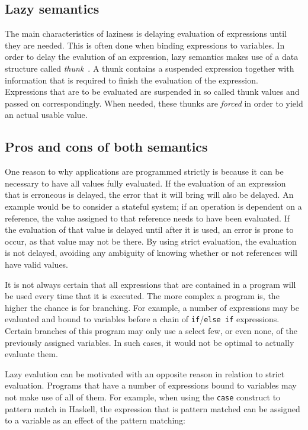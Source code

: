 \subsection{Lazy semantics}
\label{back:lazySem}
The main characteristics of laziness is delaying evaluation of expressions
until they are needed. This is often done when binding expressions to
variables. In order to delay the evalution of an expression, lazy semantics
makes use of a data structure called
\textit{thunk}~\cite{Ennals:2003:OEA:944746.944731}. A thunk contains a
suspended expression together with information that is required to finish the
evaluation of the expression. Expressions that are to be
evaluated are suspended in so called thunk values and passed on correspondingly.
When needed, these thunks are \textit{forced} in order to yield an actual usable
value.

\subsection{Pros and cons of both semantics}
One reason to why applications are programmed strictly is because it can be
necessary to have all values fully evaluated. If the evaluation of an expression
that is erroneous is delayed, the error that it will bring will also be delayed.
An example would be to consider a stateful system; if an operation is dependent
on a reference, the value assigned to that reference needs to have been
evaluated. If the evaluation of that value is delayed until after it is used,
an error is prone to occur, as that value may not be there.
By using strict evaluation, the evaluation is not delayed, avoiding any
ambiguity of knowing whether or not references will have valid values.

It is not always certain that all expressions that are contained in a program
will be used every time that it is executed. The more complex a program is, the
higher the chance is for branching. For example, a number of expressions may
be evaluated and bound to variables before a chain of
\texttt{if}/\texttt{else if} expressions. Certain branches of this program may
only use a select few, or even none, of the previously assigned variables.
In such cases, it would not be optimal to actually evaluate them.

Lazy evalution can be motivated with an opposite reason in relation to strict
evaluation. Programs that have a number of expressions bound to variables may
not make use of all of them. For example, when using the \texttt{case} construct
to pattern match in Haskell, the expression that is pattern matched can be
assigned to a variable as an effect of the pattern matching:

